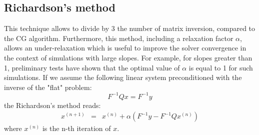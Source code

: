 \subsection{Richardson's method}
\par This technique allows to divide by 3 the number of matrix inversion,
compared to the CG algorithm. Furthermore, this method, including a
relaxation factor $\alpha$, allows an under-relaxation  which is useful to
improve the solver convergence in the context of simulations with large slopes.
For example, for slopes greater than 1, preliminary tests have shown that the
optimal value of $\alpha$ is equal to 1 for such simulations. If we assume the
following linear system preconditioned with the inverse of the "flat" problem:
\begin{equation}
F^{-1} Q x = F^{-1} y
\end{equation}
the Richardson's method reads:
\begin{eqnarray*}
x^{(n+1)} &=& x^{(n)} + \alpha (F^{-1} y - F^{-1} Q x^{(n)} )
\end{eqnarray*}
where $x^{(n)}$ is the n-th iteration of $x$.\\
